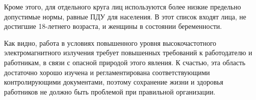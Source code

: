 Кроме этого, для отдельного круга лиц используются более низкие предельно допустимые
нормы, равные ПДУ для населения. В этот список входят лица, не достигшие 18-летнего возраста, и женщины в состоянии беременности.

Как видно, работа в условиях повышенного уровня высокочастотного электромагнитного
излучения требует повышенных требований к работодателю и работникам, в связи с опасной
природой этого явления. К счастью, эта область достаточно хорошо изучена и регламентирована
соответствующими контролирующими документами, поэтому сохранение жизни и здоровья
работников не должно быть проблемой при правильной организации.
